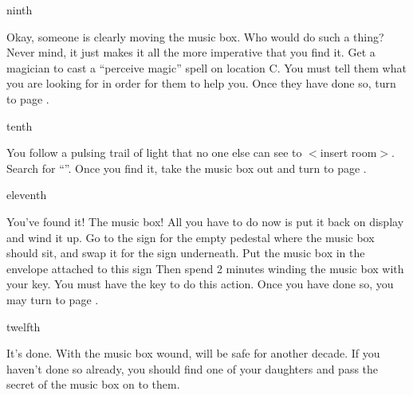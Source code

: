\documentclass[greennotebook]{NeptuneBall}
\begin{document}
\begin{page}{ninth}

Okay, someone is clearly moving the music box. Who would do such a thing? Never mind, it just makes it all the more imperative that you find it. Get a magician to cast a ``perceive magic'' spell on location C. You must tell them what you are looking for in order for them to help you. Once they have done so, turn to page .

\end{page}

\begin{page}{tenth}

You follow a pulsing trail of light that no one else can see to $<$insert room$>$. Search for ``\sPacketD{}''. Once you find it, take the music box out and turn to page .

\end{page}

\begin{page}{eleventh}

You've found it! The music box! All you have to do now is put it back on display and wind it up. Go to the sign for the empty pedestal where the music box should sit, and swap it for the sign underneath. Put the music box in the envelope attached to this sign Then spend 2 minutes winding the music box with your key. You must have the key to do this action. Once you have done so, you may turn to page .

\end{page}

\begin{page}{twelfth}

It's done. With the music box wound, \pAtlantis{} will be safe for another decade. If you haven't done so already, you should find one of your daughters and pass the secret of the music box on to them.

\end{page}

\endnotebook
\end{document}
